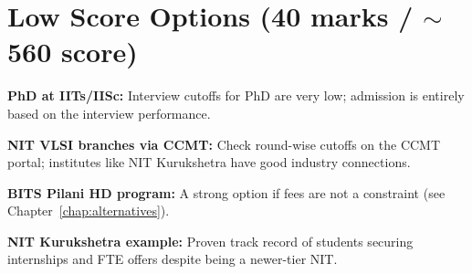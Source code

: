 \section{Low Score Options (40 marks / $\sim$560 score)}
\label{sec:low-score}

\begin{deadline}
  \begin{pfChecklist}
    \item \textbf{PhD at IITs/IISc:} Interview cutoffs for PhD are very low;
          admission is entirely based on the interview performance.
    \item \textbf{NIT VLSI branches via CCMT:} Check round-wise cutoffs on the
          CCMT portal; institutes like NIT Kurukshetra have good industry
          connections.
    \item \textbf{BITS Pilani HD program:} A strong option if fees are not a
          constraint (see Chapter~\ref{chap:alternatives}).
    \item \textbf{NIT Kurukshetra example:} Proven track record of students
          securing internships and FTE offers despite being a newer-tier NIT.
  \end{pfChecklist}
\end{deadline}
